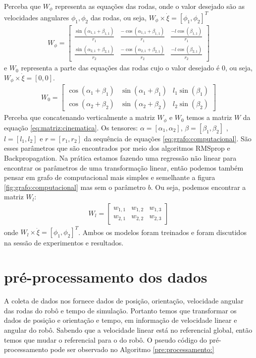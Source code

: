 Perceba que $W_{\phi}$ representa as equações das rodas, onde
o valor desejado são as velocidades angulares $\phi_1,\phi_2$ das rodas,
ou seja, $W_{\phi} \times \dot{\xi} = [\phi_{1},\phi_2]^{T} $
\begin{align}
    W_{\phi} = 
    \begin{bmatrix}
        \frac{\sin(\alpha_{1,1} + \beta_{1,1})}{r_1} &  \frac{-\cos(\alpha_{1,1} + \beta_{1,1})}{r_1} & \frac{-l\cos(\beta_{1,1})}{r_1} \\
        \frac{\sin(\alpha_{2,1} + \beta_{2,1})}{r_2} &  \frac{-\cos(\alpha_{2,1} + \beta_{2,1})}{r_2} & \frac{-l\cos(\beta_{2,1})}{r_2}
    \end{bmatrix}
\end{align}
e $W_0$ representa a parte das equações das rodas cujo o valor desejado
é 0, ou seja, $W_{\phi} \times \dot{\xi} = [0,0]$.
\begin{align}
    W_{0} = 
    \begin{bmatrix}
        \cos(\alpha_{1} + \beta_{1}) &  \sin(\alpha_{1} + \beta_{1}) &  l_1\sin(\beta_{1}) \\
        \cos(\alpha_{2} + \beta_{2}) &  \sin(\alpha_{2} + \beta_{2})  &  l_2\sin(\beta_{2})
    \end{bmatrix}
\end{align}
Perceba que concatenando verticalmente a matriz $W_{\phi}$ e $ W_{0}$ temos a matriz $W$
da equação \ref{eq:matriz:cinematica}. 
Os tensores: $\alpha =[\alpha_1,\alpha_2]$,
$\beta=[\beta_1,\beta_2]$ , $l=[l_1,l_2]$ e $r=[r_1,r_2]$
da sequência de equações \ref{eq:grafo:computacional}.
São esses parâmetros que são encontrados por meio dos algoritmos RMSprop
e Backpropagation. Na prática
estamos fazendo uma regressão não linear
para encontrar os parâmetros de uma transformação linear, então podemos também
pensar em grafo de computacional mais simples e semelhante a
figura \ref{fig:grafo:computacional} mas sem o parâmetro $b$.
Ou seja, podemos encontrar a matriz $W_l$:
\begin{align}
    W_l = 
    \begin{bmatrix}
        w_{1,1} &  w_{1,2} &  w_{1,3} \\
        w_{2,1} &  w_{2,2} &  w_{2,3}
    \end{bmatrix}
\end{align}
onde $W_l \times \dot{\xi} = [\phi_{1},\phi_2]^{T}$.
Ambos os modelos foram treinados e foram discutidos na
sessão de experimentos e resultados.


\section{pré-processamento dos dados}
A coleta de dados nos fornece dados de posição, orientação, velocidade angular
das rodas do robô e tempo de simulação. Portanto temos que transformar os dados
de posição e orientação e tempo, em informação de velocidade linear e angular
do robô. Sabendo que a velocidade linear está no referencial global, então
temos que mudar o referencial para o do robô.
O pseudo código do pré-processamento pode ser observado no Algoritmo \ref{pre:processamento:}

